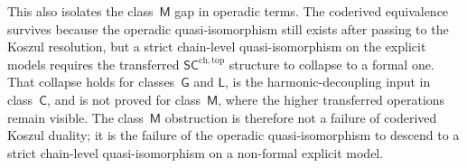 \begin{remark}
This also isolates the class~$\mathsf{M}$ gap in operadic terms. The
coderived equivalence survives because the operadic quasi-isomorphism
still exists after passing to the Koszul resolution, but a strict
chain-level quasi-isomorphism on the explicit models requires the
transferred $\mathsf{SC}^{\mathrm{ch,top}}$ structure to collapse to a
formal one. That collapse holds for classes~$\mathsf{G}$ and
$\mathsf{L}$, is the harmonic-decoupling input in class~$\mathsf{C}$,
and is not proved for class~$\mathsf{M}$, where the higher transferred
operations remain visible. The class~$\mathsf{M}$ obstruction is
therefore not a failure of coderived Koszul duality; it is the failure
of the operadic quasi-isomorphism to descend to a strict chain-level
quasi-isomorphism on a non-formal explicit model.
\end{remark}

